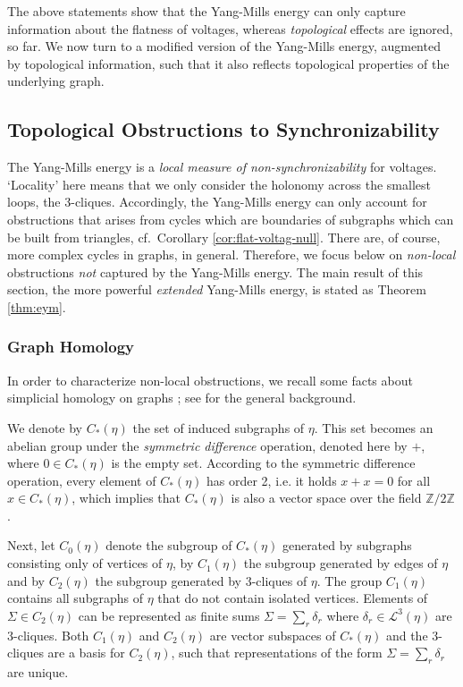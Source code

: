 \documentclass[10pt,reqno]{amsart}
\numberwithin{equation}{section}
\theoremstyle{bfnote}
\theoremstyle{bfdef}
\newcommand{\mc}[1]{\mathcal{#1}}
\begin{document}
	The above statements show that the Yang-Mills energy can only capture information about the flatness of voltages, whereas \textit{topological} effects are ignored, so far. We now turn to a modified version of the Yang-Mills energy, augmented by topological information, such that it also reflects topological properties of the underlying graph.

\subsection{Topological Obstructions to Synchronizability}
	The Yang-Mills energy is a \textit{local measure of non-synchronizability} for voltages.
	`Locality' here means that we only consider the holonomy across the smallest loops, the 3-cliques. Accordingly, the Yang-Mills energy can only account for obstructions that arises from cycles which are boundaries
		of subgraphs which can be built from triangles, cf.~Corollary \ref{cor:flat-voltag-null}.
	There are, of course, more complex cycles in graphs, in general.
Therefore, we focus below on \textit{non-local} obstructions \textit{not} captured by the Yang-Mills energy. The main result of this section, the more powerful \textit{extended} Yang-Mills energy, is stated as Theorem \ref{thm:eym}.

	\subsubsection{Graph Homology}
		In order to characterize non-local obstructions, we recall some facts about simplicial homology on graphs \cite{jiangStatisticalRankingCombinatorial2011a,grigor2015cohomology}; see \cite{Hatcher:2002aa} for the general background.

		We denote by $C_{*}(\eta)$ the set of induced subgraphs of $\eta$. This set becomes an abelian group under the \textit{symmetric difference} operation, denoted here by $+$, where $0 \in C_*(\eta)$ is the empty set. According to the symmetric difference operation, every element of $C_{*}(\eta)$ has order 2, i.e. it holds $x + x = 0$ for all $x \in C_*(\eta)$, which implies that $C_*(\eta)$ is also a vector space over the field $\mathbb{Z}/2\mathbb{Z}$.

		Next, let $C_0(\eta)$ denote the subgroup of $C_{*}(\eta)$ generated by subgraphs consisting only of vertices of $\eta$, by $C_1(\eta)$ the subgroup generated by edges of $\eta$ and by $C_2(\eta)$ the subgroup generated by 3-cliques of $\eta$. The group $C_1(\eta)$ contains all subgraphs of $\eta$ that do not contain isolated vertices. Elements of $\Sigma \in C_{2}(\eta)$ can be represented as finite sums $\Sigma = \sum_{r} \delta_{r}$ where $\delta_{r} \in \mc{L}^{3}(\eta)$ are 3-cliques. Both $C_1(\eta)$ and $C_2(\eta)$ are  vector subspaces of $C_*(\eta)$ and the 3-cliques are a basis for $C_2(\eta)$, such that representations of the form $\Sigma = \sum_{r} \delta_{r}$ are unique.
\end{document}
